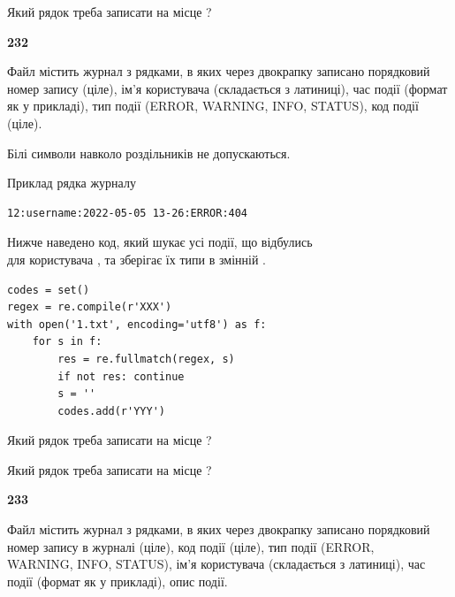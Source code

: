 Який рядок треба записати на місце  ?\par


\newpage

{\begin {center}\textbf{ 232}\end {center}}\par
Файл  містить журнал з рядками, в яких через двокрапку записано поряд\-ко\-вий номер запису (ціле), ім'я користувача (складається з латиниці), час події (фор\-мат як у прикладі), тип події (ERROR, WARNING, INFO, STATUS), код події (ціле).

Білі символи навколо роздільників не допускаються.

Приклад рядка журналу



\begin{verbatim}
12:username:2022-05-05 13-26:ERROR:404
\end{verbatim}


Нижче наведено код, який шукає усі події, що відбулись\\ для користувача , та зберігає їх типи в змінній .



\begin{verbatim}
codes = set()
regex = re.compile(r'XXX')
with open('1.txt', encoding='utf8') as f:
    for s in f:
        res = re.fullmatch(regex, s)
        if not res: continue
        s = ''
        codes.add(r'YYY')
\end{verbatim}





Який рядок треба записати на місце  ?\par
\vspace{5mm}


Який рядок треба записати на місце  ?\par


\newpage

{\begin {center}\textbf{ 233}\end {center}}\par
Файл  містить журнал з рядками, в яких через двокрапку записано поряд\-ко\-вий номер запису в журналі (ціле), код події (ціле), тип події (ERROR, \\WARNING, INFO, STATUS), ім'я користувача (складається з латиниці), час події (фор\-мат як у прикладі), опис події.

